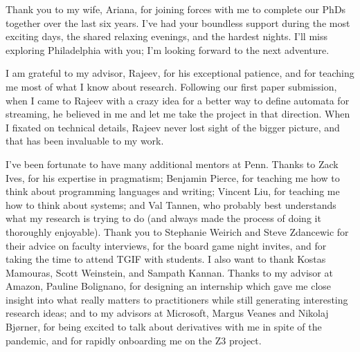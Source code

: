 Thank you to my wife, Ariana, for joining forces with me to complete our PhDs together over the last six years.
I've had your boundless support during the most exciting days, the shared relaxing evenings, and the hardest nights.
I'll miss exploring Philadelphia with you; I'm looking forward to the next adventure.

I am grateful to my advisor, Rajeev, for his exceptional patience, and for teaching me most of what I know about research.
Following our first paper submission, when I came to Rajeev with a crazy idea for a better way to define automata for streaming, he believed in me and let me take the project in that direction.
When I fixated on technical details, Rajeev never lost sight of the bigger picture, and that has been invaluable to my work.

I've been fortunate to have many additional mentors at Penn. Thanks to Zack Ives, for his expertise in pragmatism; Benjamin Pierce, for teaching me how to think about programming languages and writing; Vincent Liu, for teaching me how to think about systems; and Val Tannen, who probably best understands what my research is trying to do (and always made the process of doing it thoroughly enjoyable).
Thank you to Stephanie Weirich and Steve Zdancewic for their advice on faculty interviews, for the board game night invites, and for taking the time to attend TGIF with students.
I also want to thank Kostas Mamouras, Scott Weinstein, and Sampath Kannan.
Thanks to my advisor at Amazon, Pauline Bolignano, for designing an internship which gave me close insight into what really matters to practitioners while still generating interesting research ideas; and to my advisors at Microsoft, Margus Veanes and Nikolaj Bjørner,
for being excited to talk about derivatives with me in spite of the pandemic, and for rapidly onboarding me on the Z3 project.

